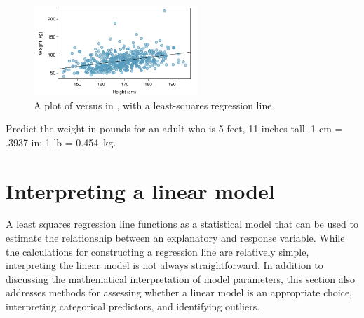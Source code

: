 \begin{figure}[h]
	\centering
	\includegraphics[width=0.55\textwidth]
	{ch_simple_linear_regression_oi_biostat/figures/nhanesHeightWeightRegress/nhanesHeightWeightRegress}
	\caption{A plot of  versus  in , with a least-squares regression line}
	\label{nhanesHeightWeightRegress}
\end{figure}

\begin{exercisewrap}
\begin{nexercise}\label{predictingNHANESWeightfrmHeightMetric}%
Predict the weight in pounds for an adult who is 5 feet, 11 inches tall. 1 cm = .3937 in; 1 lb = 0.454~kg.\footnotemark{}
\end{nexercise}
\end{exercisewrap}



\section{Interpreting a linear model}
\label{interpretingLeastSquaresLine}


A least squares regression line functions as a statistical model that can be used to estimate the relationship between an explanatory and response variable. While the calculations for constructing a regression line are relatively simple, interpreting the linear model is not always straightforward. In addition to discussing the mathematical interpretation of model parameters, this section also addresses methods for assessing whether a linear model is an appropriate choice, interpreting categorical predictors, and identifying outliers.

